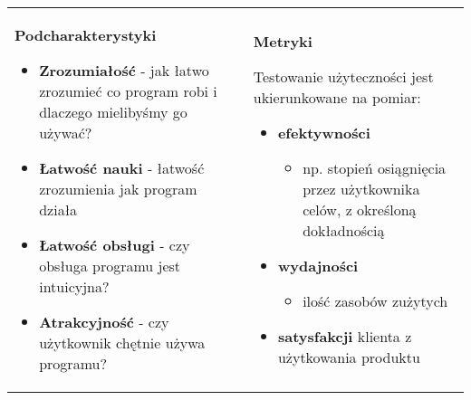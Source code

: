 \documentclass[../main.tex]{subfiles}
\begin{document}
    \begin{table}[H]
        \begin{center}
            \begin{tabular}{p{8cm} p{8cm}}
                \textbf{Podcharakterystyki}
                \begin{itemize}
                    \item \textbf{Zrozumiałość} - jak łatwo zrozumieć co program robi i dlaczego mielibyśmy go używać?
                    \item \textbf{Łatwość nauki} - łatwość zrozumienia jak program działa
                    \item \textbf{Łatwość obsługi} - czy obsługa programu jest intuicyjna?
                    \item \textbf{Atrakcyjność} - czy użytkownik chętnie używa programu?
                \end{itemize}
                &
                \textbf{Metryki}

                Testowanie użyteczności jest ukierunkowane na pomiar:
                \begin{itemize}
                    \item \textbf{efektywności}
                    \begin{itemize}
                        \item np. stopień osiągnięcia przez użytkownika celów, z
                        określoną dokładnością
                    \end{itemize}
                    \item \textbf{wydajności}
                    \begin{itemize}
                        \item ilość zasobów zużytych
                    \end{itemize}
                    \item \textbf{satysfakcji} klienta z użytkowania produktu
                \end{itemize}
            \end{tabular}
        \end{center}
    \end{table}
\end{document}
